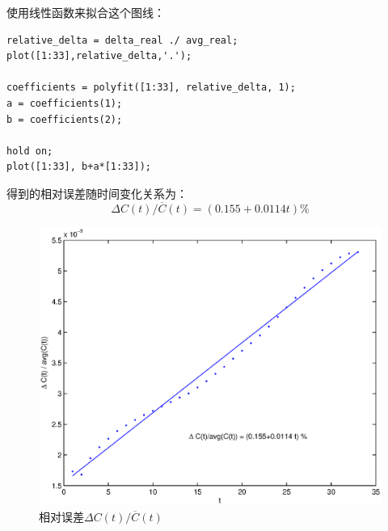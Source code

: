 \documentclass[paper=a4, fontsize=11pt]{scrartcl} %
\numberwithin{equation}{section} %
\numberwithin{figure}{section} %
\numberwithin{table}{section} %
\begin{document}
\begin{CJK*}{UTF8}{gbsn}
使用线性函数来拟合这个图线：
\lstset{language=MATLAB}
\begin{lstlisting}
relative_delta = delta_real ./ avg_real;
plot([1:33],relative_delta,'.');

coefficients = polyfit([1:33], relative_delta, 1);
a = coefficients(1);
b = coefficients(2);

hold on;
plot([1:33], b+a*[1:33]);
\end{lstlisting}
得到的相对误差随时间变化关系为：
\begin{equation}
\Delta C(t) / \overline{C}(t) = (0.155+0.0114 t) \%
\end{equation}
\begin{figure}[H]
\centering
\includegraphics[width=140mm]{problem3_a_2.eps}
\caption{相对误差$\Delta C(t) / \overline{C}(t)$}
\end{figure}


\end{CJK*}
\end{document}
